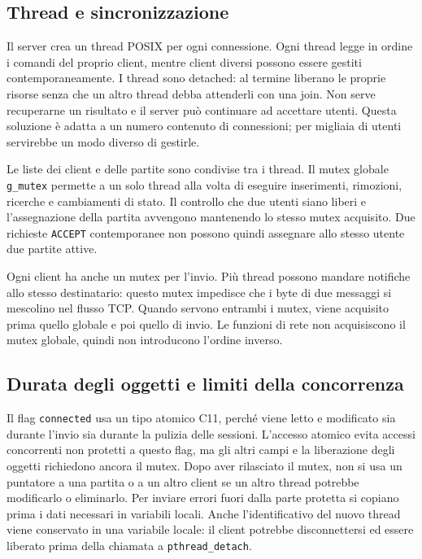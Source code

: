 \documentclass[11pt,a4paper]{article}
\begin{document}
\subsection{Thread e sincronizzazione}

Il server crea un thread POSIX per ogni connessione. Ogni thread legge in ordine i comandi del proprio client, mentre client diversi possono essere gestiti contemporaneamente. I thread sono detached: al termine liberano le proprie risorse senza che un altro thread debba attenderli con una join. Non serve recuperarne un risultato e il server può continuare ad accettare utenti. Questa soluzione è adatta a un numero contenuto di connessioni; per migliaia di utenti servirebbe un modo diverso di gestirle.

Le liste dei client e delle partite sono condivise tra i thread. Il mutex globale \texttt{g\_mutex} permette a un solo thread alla volta di eseguire inserimenti, rimozioni, ricerche e cambiamenti di stato. Il controllo che due utenti siano liberi e l'assegnazione della partita avvengono mantenendo lo stesso mutex acquisito. Due richieste \texttt{ACCEPT} contemporanee non possono quindi assegnare allo stesso utente due partite attive.

Ogni client ha anche un mutex per l'invio. Più thread possono mandare notifiche allo stesso destinatario: questo mutex impedisce che i byte di due messaggi si mescolino nel flusso TCP. Quando servono entrambi i mutex, viene acquisito prima quello globale e poi quello di invio. Le funzioni di rete non acquisiscono il mutex globale, quindi non introducono l'ordine inverso.

\subsection{Durata degli oggetti e limiti della concorrenza}

Il flag \texttt{connected} usa un tipo atomico C11, perché viene letto e modificato sia durante l'invio sia durante la pulizia delle sessioni. L'accesso atomico evita accessi concorrenti non protetti a questo flag, ma gli altri campi e la liberazione degli oggetti richiedono ancora il mutex. Dopo aver rilasciato il mutex, non si usa un puntatore a una partita o a un altro client se un altro thread potrebbe modificarlo o eliminarlo. Per inviare errori fuori dalla parte protetta si copiano prima i dati necessari in variabili locali. Anche l'identificativo del nuovo thread viene conservato in una variabile locale: il client potrebbe disconnettersi ed essere liberato prima della chiamata a \texttt{pthread\_detach}.
\end{document}
